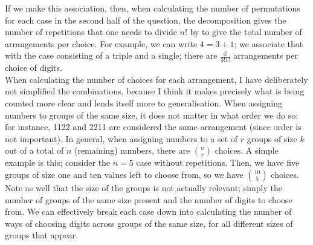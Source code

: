 \documentclass[a4paper,11pt]{article}
\begin{document}
\noindent If we make this association, then, when calculating the number of permutations for each case in the second half of the question, the decomposition gives the number of repetitions that one needs to divide $n!$ by to give the total number of arrangements per choice. For example, we can write $4=3+1$; we associate that with the case consisting of a triple and a single; there are $\frac{4!}{3!1!}$ arrangements per choice of digits.\\

\noindent When calculating the number of choices for each arrangement, I have deliberately not simplified the combinations, because I think it makes precisely what is being counted more clear and lends itself more to generalisation. When assigning numbers to groups of the same size, it does not matter in what order we do so: for instance, 1122 and 2211 are considered the same arrangement (since order is not important). In general, when assigning numbers to a set of $r$ groups of size $k$ out of a total of $n$ (remaining) numbers, there are $\binom{n}{r}$ choices. A simple example is this; consider the $n=5$ case without repetitions. Then, we have five groups of size one and ten values left to choose from, so we have $\binom{10}{5}$ choices. Note as well that the size of the groups is not actually relevant; simply the number of groups of the same size present and the number of digits to choose from. We can effectively break each case down into calculating the number of ways of choosing digits across groups of the same size, for all different sizes of groups that appear.
\end{document}
